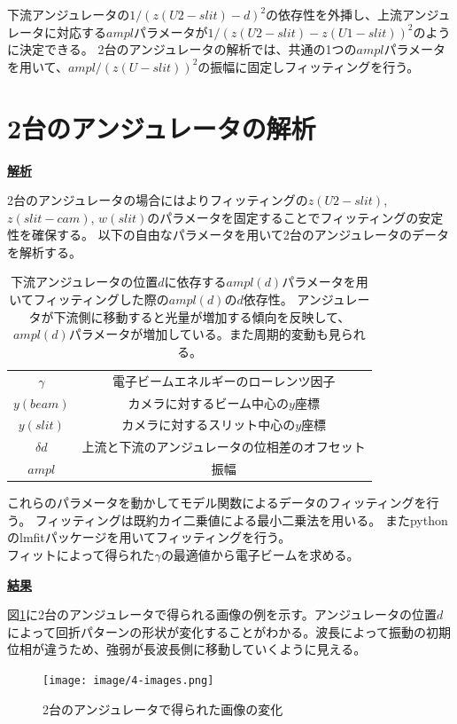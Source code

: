 \documentclass[a4paper,11pt,uplatex]{jsbook}
\begin{document}
下流アンジュレータの$1/(z(U2-slit) - d)^2$の依存性を外挿し、上流アンジュレータに対応する$ampl$パラメータが$1/(z(U2-slit) -z(U1-slit))^2$のように決定できる。
2台のアンジュレータの解析では、共通の1つの$ampl$パラメータを用いて、$ampl/(z(U-slit))^2$の振幅に固定しフィッティングを行う。

\section{2台のアンジュレータの解析}
\noindent \textbf{\underline{解析}}\par
2台のアンジュレータの場合にはよりフィッティングの$z(U2-slit)$, $z(slit-cam)$, $w(slit)$のパラメータを固定することでフィッティングの安定性を確保する。
以下の自由なパラメータを用いて2台のアンジュレータのデータを解析する。
\begin{table}[h]
\centering
\begin{tabular}{c|c}
  $\gamma$ & 電子ビームエネルギーのローレンツ因子 \\
  $y(beam)$ & カメラに対するビーム中心の$y$座標 \\
  $y(slit)$ & カメラに対するスリット中心の$y$座標 \\
  $\delta d$ & 上流と下流のアンジュレータの位相差のオフセット\\
  $ampl$ & 振幅
\end{tabular}
\caption[位置に依存する振幅パラメータによるフィッティング]{下流アンジュレータの位置$d$に依存する$ampl(d)$パラメータを用いてフィッティングした際の$ampl(d)$の$d$依存性。
アンジュレータが下流側に移動すると光量が増加する傾向を反映して、$ampl(d)$パラメータが増加している。また周期的変動も見られる。}
\end{table}

これらのパラメータを動かしてモデル関数によるデータのフィッティングを行う。
フィッティングは既約カイ二乗値による最小二乗法を用いる。
またpythonのlmfitパッケージ\cite{lmfit}を用いてフィッティングを行う。\\
フィットによって得られた$\gamma$の最適値から電子ビームを求める。

\noindent \textbf{\underline{結果}}\par
図\ref{images}に2台のアンジュレータで得られる画像の例を示す。アンジュレータの位置$d$によって回折パターンの形状が変化することがわかる。波長によって振動の初期位相が違うため、強弱が長波長側に移動していくように見える。
\begin{figure}[h]
  \centering
  \texttt{[image: image/4-images.png]}
  \caption[干渉による画像の変化]{2台のアンジュレータで得られた画像の変化}\label{images}
\end{figure}
\end{document}
